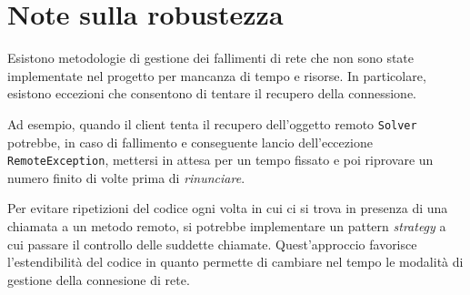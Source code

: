 \documentclass[a4paper, 12pt]{article}
\begin{document}
\section{Note sulla robustezza}
Esistono metodologie di gestione dei fallimenti di rete che non sono state
implementate nel progetto per mancanza di tempo e risorse. In particolare,
esistono eccezioni che consentono di tentare il recupero della connessione.

Ad esempio, quando il client tenta il recupero dell'oggetto remoto
\verb|Solver| potrebbe, in caso di fallimento e conseguente lancio
dell'eccezione \verb|RemoteException|, mettersi in attesa per un tempo fissato e
poi riprovare un numero finito di volte prima di \emph{rinunciare}.

Per evitare ripetizioni del codice ogni volta in cui ci si trova in presenza di
una chiamata a un metodo remoto, si potrebbe implementare un pattern
\emph{strategy} a cui passare il controllo delle suddette chiamate.
Quest'approccio favorisce l'estendibilità del codice in quanto permette di
cambiare nel tempo le modalità di gestione della connesione di rete.
\end{document}
